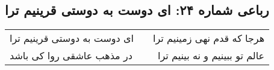 \begin{center}
\section*{رباعی شماره ۲۴: ای دوست به دوستی قرینیم ترا}
\label{sec:0024}
\begin{longtable}{l p{0.5cm} r}
ای دوست به دوستی قرینیم ترا
&&
هرجا که قدم نهی زمینیم ترا
\\
در مذهب عاشقی روا کی باشد
&&
عالم تو ببینیم و نه بینیم ترا
\\
\end{longtable}
\end{center}
